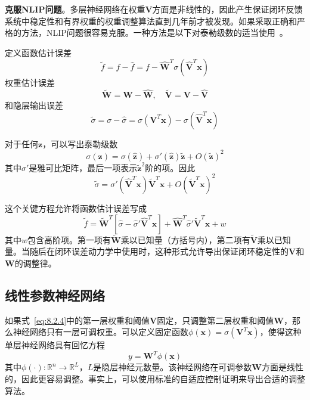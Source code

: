 \documentclass[12pt,a4paper]{ctexart}
\begin{document}
\textbf{克服NLIP问题}。多层神经网络在权重$\bm{V}$方面是非线性的，因此产生保证闭环反馈系统中稳定性和有界权重的权重调整算法直到几年前才被发现。如果采取正确和严格的方法，NLIP问题很容易克服。一种方法是以下对泰勒级数的适当使用~\cite{lewis1996}。

定义函数估计误差
\begin{equation}\label{eq:8.2.8}
\tilde{f} = f - \hat{f} = f - \hat{\bm{W}}^T \sigma(\hat{\bm{V}}^T \bm{x})
\end{equation}
权重估计误差
\begin{equation}\label{eq:8.2.9}
\tilde{\bm{W}} = \bm{W} - \hat{\bm{W}}, \quad \tilde{\bm{V}} = \bm{V} - \hat{\bm{V}}
\end{equation}
和隐层输出误差
\begin{equation}\label{eq:8.2.10}
\tilde{\sigma} = \sigma - \hat{\sigma} = \sigma(\bm{V}^T \bm{x}) - \sigma(\hat{\bm{V}}^T \bm{x})
\end{equation}

对于任何$\bm{z}$，可以写出泰勒级数
\begin{equation}\label{eq:8.2.11}
\sigma(\bm{z}) = \sigma(\hat{\bm{z}}) + \sigma'(\hat{\bm{z}})\tilde{\bm{z}} + O(\tilde{\bm{z}})^2
\end{equation}
其中$\sigma'$是雅可比矩阵，最后一项表示$\tilde{\bm{z}}^2$阶的项。因此
\begin{equation}\label{eq:8.2.12}
\tilde{\sigma} = \sigma'(\hat{\bm{V}}^T \bm{x})\tilde{\bm{V}}^T \bm{x} + O(\tilde{\bm{V}}^T \bm{x})^2
\end{equation}

这个关键方程允许将函数估计误差写成
\begin{equation}\label{eq:8.2.13}
\tilde{f} = \tilde{\bm{W}}^T \left[\hat{\sigma} - \hat{\sigma}'\hat{\bm{V}}^T \bm{x}\right] + \hat{\bm{W}}^T \hat{\sigma}' \tilde{\bm{V}}^T \bm{x} + w
\end{equation}
其中$w$包含高阶项。第一项有$\tilde{\bm{W}}$乘以已知量（方括号内），第二项有$\tilde{\bm{V}}$乘以已知量。当随后在闭环误差动力学中使用时，这种形式允许导出保证闭环稳定性的$\bm{V}$和$\bm{W}$的调整律。

\subsection{线性参数神经网络}

如果式~\eqref{eq:8.2.4}中的第一层权重和阈值$\bm{V}$固定，只调整第二层权重和阈值$\bm{W}$，那么神经网络只有一层可调权重。可以定义固定函数$\phi(\bm{x}) = \sigma(\bm{V}^T \bm{x})$，使得这种单层神经网络具有回忆方程
\begin{equation}\label{eq:8.2.14}
y = \bm{W}^T \phi(\bm{x})
\end{equation}
其中$\phi(\cdot): \mathbb{R}^n \to \mathbb{R}^L$，$L$是隐层神经元数量。该神经网络在可调参数$\bm{W}$方面是线性的，因此更容易调整。事实上，可以使用标准的自适应控制证明来导出合适的调整算法。
\end{document}
